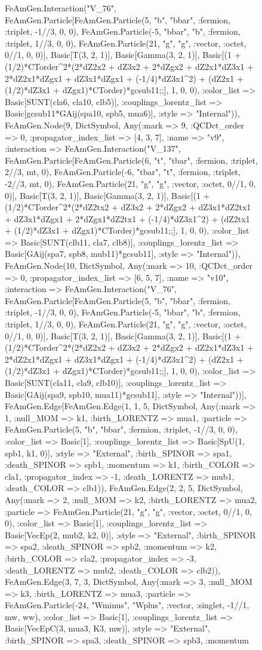 \documentclass{revtex4}
\begin{document}
\begin{figure}[!htb]
\begin{center}
{FeAmGen.Interaction("V_76", FeAmGen.Particle[FeAmGen.Particle(5, "b", "bbar", :fermion, :triplet, -1//3, 0, 0), FeAmGen.Particle(-5, "bbar", "b", :fermion, :triplet, 1//3, 0, 0), FeAmGen.Particle(21, "g", "g", :vector, :octet, 0//1, 0, 0)], Basic[T(3, 2, 1)], Basic[Gamma(3, 2, 1)], Basic[(1 + (1/2)*CTorder^2*(2*dZ2x2 + dZ3x2 + 2*dZgx2 + dZ2x1*dZ3x1 + 2*dZ2x1*dZgx1 + dZ3x1*dZgx1 + (-1/4)*dZ3x1^2) + (dZ2x1 + (1/2)*dZ3x1 + dZgx1)*CTorder)*gcsub11;;], 1, 0, 0), :color_list => Basic[SUNT(cla6, cla10, clb5)], :couplings_lorentz_list => Basic[gcsub11*GAij(spa10, spb5, mua6)], :style => "Internal")), FeAmGen.Node(9, Dict{Symbol, Any}(:mark => 9, :QCDct_order => 0, :propagator_index_list => [4, 3, 7], :name => "v9", :interaction => FeAmGen.Interaction("V_137", FeAmGen.Particle[FeAmGen.Particle(6, "t", "tbar", :fermion, :triplet, 2//3, mt, 0), FeAmGen.Particle(-6, "tbar", "t", :fermion, :triplet, -2//3, mt, 0), FeAmGen.Particle(21, "g", "g", :vector, :octet, 0//1, 0, 0)], Basic[T(3, 2, 1)], Basic[Gamma(3, 2, 1)], Basic[(1 + (1/2)*CTorder^2*(2*dZ2tx2 + dZ3x2 + 2*dZgx2 + dZ3x1*dZ2tx1 + dZ3x1*dZgx1 + 2*dZgx1*dZ2tx1 + (-1/4)*dZ3x1^2) + (dZ2tx1 + (1/2)*dZ3x1 + dZgx1)*CTorder)*gcsub11;;], 1, 0, 0), :color_list => Basic[SUNT(clb11, cla7, clb8)], :couplings_lorentz_list => Basic[GAij(spa7, spb8, mub11)*gcsub11], :style => "Internal")), FeAmGen.Node(10, Dict{Symbol, Any}(:mark => 10, :QCDct_order => 0, :propagator_index_list => [6, 5, 7], :name => "v10", :interaction => FeAmGen.Interaction("V_76", FeAmGen.Particle[FeAmGen.Particle(5, "b", "bbar", :fermion, :triplet, -1//3, 0, 0), FeAmGen.Particle(-5, "bbar", "b", :fermion, :triplet, 1//3, 0, 0), FeAmGen.Particle(21, "g", "g", :vector, :octet, 0//1, 0, 0)], Basic[T(3, 2, 1)], Basic[Gamma(3, 2, 1)], Basic[(1 + (1/2)*CTorder^2*(2*dZ2x2 + dZ3x2 + 2*dZgx2 + dZ2x1*dZ3x1 + 2*dZ2x1*dZgx1 + dZ3x1*dZgx1 + (-1/4)*dZ3x1^2) + (dZ2x1 + (1/2)*dZ3x1 + dZgx1)*CTorder)*gcsub11;;], 1, 0, 0), :color_list => Basic[SUNT(cla11, cla9, clb10)], :couplings_lorentz_list => Basic[GAij(spa9, spb10, mua11)*gcsub11], :style => "Internal"))], FeAmGen.Edge[FeAmGen.Edge(1, 1, 5, Dict{Symbol, Any}(:mark => 1, :null_MOM => k1, :birth_LORENTZ => mua1, :particle => FeAmGen.Particle(5, "b", "bbar", :fermion, :triplet, -1//3, 0, 0), :color_list => Basic[1], :couplings_lorentz_list => Basic[SpU(1, spb1, k1, 0)], :style => "External", :birth_SPINOR => spa1, :death_SPINOR => spb1, :momentum => k1, :birth_COLOR => cla1, :propagator_index => -1, :death_LORENTZ => mub1, :death_COLOR => clb1)), FeAmGen.Edge(2, 2, 5, Dict{Symbol, Any}(:mark => 2, :null_MOM => k2, :birth_LORENTZ => mua2, :particle => FeAmGen.Particle(21, "g", "g", :vector, :octet, 0//1, 0, 0), :color_list => Basic[1], :couplings_lorentz_list => Basic[VecEp(2, mub2, k2, 0)], :style => "External", :birth_SPINOR => spa2, :death_SPINOR => spb2, :momentum => k2, :birth_COLOR => cla2, :propagator_index => -3, :death_LORENTZ => mub2, :death_COLOR => clb2)), FeAmGen.Edge(3, 7, 3, Dict{Symbol, Any}(:mark => 3, :null_MOM => k3, :birth_LORENTZ => mua3, :particle => FeAmGen.Particle(-24, "Wminus", "Wplus", :vector, :singlet, -1//1, mw, ww), :color_list => Basic[1], :couplings_lorentz_list => Basic[VecEpC(3, mua3, K3, mw)], :style => "External", :birth_SPINOR => spa3, :death_SPINOR => spb3, :momentum }
\end{center}
\end{figure}
\end{document}
